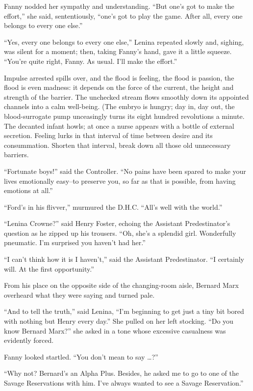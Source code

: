 \documentclass[12pt]{report}
\begin{document}
Fanny nodded her sympathy and understanding. ``But one's got to make the
effort,'' she said, sententiously, ``one's got to play the game. After
all, every one belongs to every one else.''

``Yes, every one belongs to every one else,'' Lenina repeated slowly
and, sighing, was silent for a moment; then, taking Fanny's hand, gave
it a little squeeze. ``You're quite right, Fanny. As usual. I'll make
the effort.''

Impulse arrested spills over, and the flood is feeling, the flood is
passion, the flood is even madness: it depends on the force of the
current, the height and strength of the barrier. The unchecked stream
flows smoothly down its appointed channels into a calm well-being. (The
embryo is hungry; day in, day out, the blood-surrogate pump unceasingly
turns its eight hundred revolutions a minute. The decanted infant howls;
at once a nurse appears with a bottle of external secretion. Feeling
lurks in that interval of time between desire and its consummation.
Shorten that interval, break down all those old unnecessary barriers.

``Fortunate boys!'' said the Controller. ``No pains have been spared to
make your lives emotionally easy--to preserve you, so far as that is
possible, from having emotions at all.''

``Ford's in his flivver,'' murmured the D.H.C. ``All's well with the
world.''

``Lenina Crowne?'' said Henry Foster, echoing the Assistant
Predestinator's question as he zipped up his trousers. ``Oh, she's a
splendid girl. Wonderfully pneumatic. I'm surprised you haven't had
her.''

``I can't think how it is I haven't,'' said the Assistant Predestinator.
``I certainly will. At the first opportunity.''

From his place on the opposite side of the changing-room aisle, Bernard
Marx overheard what they were saying and turned pale.

``And to tell the truth,'' said Lenina, ``I'm beginning to get just a
tiny bit bored with nothing but Henry every day.'' She pulled on her
left stocking. ``Do you know Bernard Marx?'' she asked in a tone whose
excessive casualness was evidently forced.

Fanny looked startled. ``You don't mean to say \ldots{}?''

``Why not? Bernard's an Alpha Plus. Besides, he asked me to go to one of
the Savage Reservations with him. I've always wanted to see a Savage
Reservation.''
\end{document}
